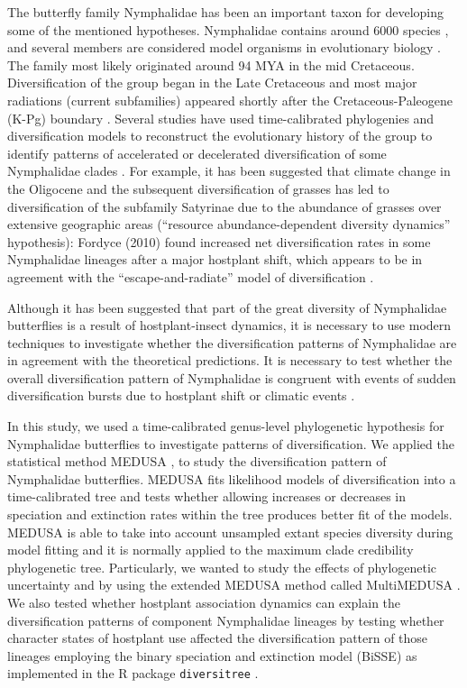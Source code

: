 \documentclass[10pt,letterpaper]{article}
\begin{document}
The butterfly family Nymphalidae has been an important taxon for
developing some of the mentioned hypotheses. Nymphalidae contains around
6000 species \cite{van_nieukerken2011}, and several members are considered model organisms
in evolutionary biology \cite{joron2006, willmott2006, brakefield2009}.
The family most likely originated
around 94 MYA in the mid Cretaceous. Diversification of the group began
in the Late Cretaceous and most major radiations (current subfamilies)
appeared shortly after the Cretaceous-Paleogene (K-Pg) boundary
\cite{heikkila2012}. Several studies have used time-calibrated phylogenies and
diversification models to reconstruct the evolutionary history of the
group to identify patterns of accelerated or decelerated diversification
of some Nymphalidae clades \cite{heikkila2012, elias2009, fordyce2010, wahlberg2009}.
For example, it has been
suggested that climate change in the Oligocene and the subsequent
diversification of grasses has led to diversification of the subfamily
Satyrinae \cite{pena2008} due to the abundance of grasses over extensive
geographic areas (``resource abundance-dependent diversity dynamics''
hypothesis): Fordyce (2010) \cite{fordyce2010} found increased net diversification
rates in some Nymphalidae lineages after a major hostplant shift, which
appears to be in agreement with the ``escape-and-radiate'' model of
diversification \cite{ehrlich1964}.

Although it has been suggested that part of the great diversity of
Nymphalidae butterflies is a result of hostplant-insect dynamics, it is
necessary to use modern techniques to investigate whether the
diversification patterns of Nymphalidae are in agreement with the
theoretical predictions. It is necessary to test whether the overall
diversification pattern of Nymphalidae is congruent with events of
sudden diversification bursts due to hostplant shift or climatic events
\cite{nylin2014, ferrer2013}.

In this study, we used a time-calibrated genus-level phylogenetic
hypothesis for Nymphalidae butterflies \cite{wahlberg2009} to investigate patterns
of diversification. We applied the statistical method MEDUSA
\cite{alfaro2009, harmon2011}, to study the diversification pattern of Nymphalidae
butterflies. MEDUSA fits likelihood models of diversification into a
time-calibrated tree and tests whether allowing increases or decreases
in speciation and extinction rates within the tree produces better fit
of the models. MEDUSA is able to take into account unsampled extant
species diversity during model fitting and it is normally applied to the
maximum clade credibility phylogenetic tree. Particularly, we wanted to
study the effects of phylogenetic uncertainty and by using the extended
MEDUSA method called MultiMEDUSA \cite{alfaro2009}. We also tested whether
hostplant association dynamics can explain the diversification patterns
of component Nymphalidae lineages by testing whether character states of
hostplant use affected the diversification pattern of those lineages
employing the binary speciation and extinction model (BiSSE) as
implemented in the R package \texttt{diversitree} \cite{fitzjohn2012}.
\end{document}
